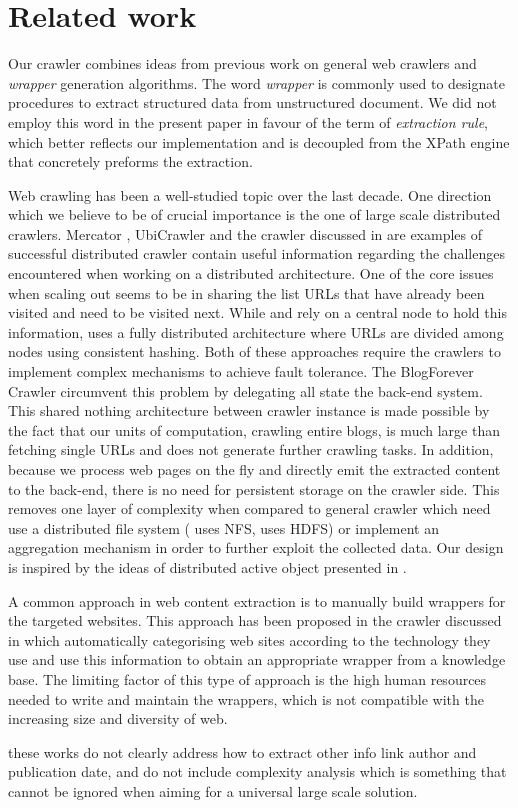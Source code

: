 \section{Related work}
\label{relatedwork}

Our crawler combines ideas from previous work on general web crawlers and \emph{wrapper} generation algorithms. The word \emph{wrapper} is commonly used to designate procedures to extract structured data from unstructured document. We did not employ this word in the present paper in favour of the term of \emph{extraction rule}, which better reflects our implementation and is decoupled from the XPath engine that concretely preforms the extraction.

Web crawling has been a well-studied topic over the last decade. One direction which we believe to be of crucial importance is the one of large scale distributed crawlers. Mercator \cite{heydon99mercator}, UbiCrawler \cite{boldi2003} and the crawler discussed in \cite{shkapenyuk2002} are examples of successful distributed crawler contain useful information regarding the challenges encountered when working on a distributed architecture. One of the core issues when scaling out seems to be in sharing the list URLs that have already been visited and need to be visited next. While \cite{heydon99mercator} and \cite{shkapenyuk2002} rely on a central node to hold this information, \cite{boldi2003} uses a fully distributed architecture where URLs are divided among nodes using consistent hashing. Both of these approaches require the crawlers to implement complex mechanisms to achieve fault tolerance.
%
The BlogForever Crawler circumvent this problem by delegating all state the back-end system. This shared nothing architecture between crawler instance is made possible by the fact that our units of computation, crawling entire blogs, is much large than fetching single URLs and does not generate further crawling tasks.
%
In addition, because we process web pages on the fly and directly emit the extracted content to the back-end, there is no need for persistent storage on the crawler side. This removes one layer of complexity when compared to general crawler which need use a distributed file system (\cite{shkapenyuk2002} uses NFS, \cite{berger2011} uses HDFS) or implement an aggregation mechanism in order to further exploit the collected data. Our design is inspired by the ideas of distributed active object presented in \cite{activeobject1996}.



A common approach in web content extraction is to manually build wrappers for the targeted websites. This approach has been proposed in the crawler discussed in \cite{faheem2012intelligent} which automatically categorising web sites according to the technology they use and use this information to obtain an appropriate wrapper from a knowledge base. The limiting factor of this type of approach is the high human resources needed to write and maintain the wrappers, which is not compatible with the increasing size and diversity of web.


these works do not clearly address how to extract other info link author and publication date, and do not include complexity analysis which is something that cannot be ignored when aiming for a universal large scale solution.


